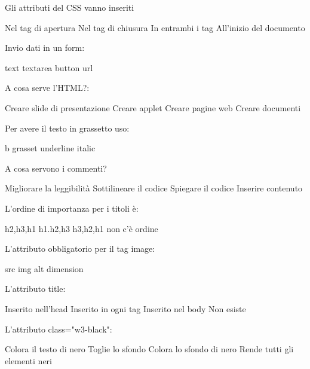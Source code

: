 \documentclass[addpoints]{exam}
\begin{document}
\begin{questions}
\begin{multicols}{2}
\question[\half] Gli attributi del CSS vanno inseriti
\begin{checkboxes}
	\choice Nel tag di apertura
	\choice Nel tag di chiusura
	\choice In entrambi i tag
	\choice All'inizio del documento
\end{checkboxes}

\question[\half] Invio dati in un form:
\begin{checkboxes}
	\choice text
	\choice textarea
	\choice button
	\choice url
\end{checkboxes}

\question[\half] A cosa serve l'HTML?:
\begin{checkboxes}
	\choice Creare slide di presentazione
	\choice Creare applet
	\choice Creare pagine web
	\choice Creare documenti
\end{checkboxes}

\question[\half] Per avere il testo in grassetto uso:
\begin{checkboxes}
	\choice b
	\choice grasset
	\choice underline
	\choice italic
\end{checkboxes}

\question[\half] A cosa servono i commenti?
\begin{checkboxes}
	\choice Migliorare la leggibilità
	\choice Sottilineare il codice
	\choice Spiegare il codice
	\choice Inserire contenuto
\end{checkboxes}

\question[\half] L'ordine di importanza per i titoli è:
\begin{checkboxes}
	\choice h2,h3,h1
	\choice h1.h2,h3
	\choice h3,h2,h1
	\choice non c'è ordine
\end{checkboxes}

\question[\half] L'attributo obbligatorio per il tag image:
\begin{checkboxes}
	\choice src
	\choice img
	\choice alt
	\choice dimension
\end{checkboxes}

\question[\half] L'attributo title:
\begin{checkboxes}
	\choice Inserito nell'head
	\choice Inserito in ogni tag
	\choice Inserito nel body
	\choice Non esiste
\end{checkboxes}

\question[\half] L'attributo class="w3-black":
\begin{checkboxes}
	\choice Colora il testo di nero
	\choice Toglie lo sfondo
	\choice Colora lo sfondo di nero
	\choice Rende tutti gli elementi neri
\end{checkboxes}


\end{multicols}
\end{questions}
\end{document}
